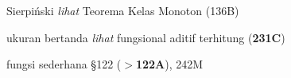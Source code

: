 






















































































Sierpi\'nski {\it lihat} Teorema Kelas Monoton (136B)



ukuran bertanda 
  {\it lihat} fungsional aditif terhitung ({\bf 231C})











fungsi sederhana \S122 ({\bf $\pmb{>}$122A}), 242M
  











